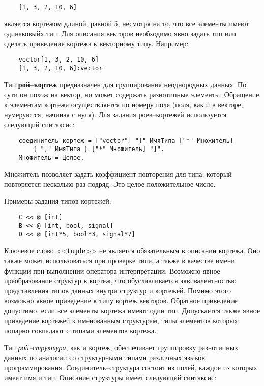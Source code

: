 {\begin{verbatim}
    [1, 3, 2, 10, 6]
\end{verbatim}

является кортежом длиной, равной 5, несмотря на то, что все элементы имеют одинаковыйх тип. Для описания векторов необходимо явно задать тип или сделать приведение кортежа к векторному типу. Например:

\begin{verbatim}
    vector[1, 3, 2, 10, 6]
    [1, 3, 2, 10, 6]:vector
\end{verbatim}

Тип \textbf{рой--кортеж} предназначен для группирования неоднородных данных. По сути он похож на вектор, но может содержать разнотипные элементы. Обращение к элементам кортежа осуществляется по номеру поля (поля, как и в векторе, нумеруются, начиная с нуля). Для задания роев--кортежей используется следующий синтаксис:

\begin{verbatim}
    соединитель-кортеж = ["vector"] "[" ИмяТипа ["*" Множитель]
        { "," ИмяТипа } ["*" Множитель] "]".
    Множитель = Целое.
\end{verbatim}

Множитель позволяет задать коэффициент повторения для типа, который повторяется несколько раз подряд. Это целое положительное число.

Примеры задания типов кортежей:

\begin{verbatim}
    С << @ [int]
    В << @ [int, bool, signal]
    D << @ [int*5, bool*3, signal*7]
\end{verbatim}

Ключевое слово <<\textbf{tuple}>> не является обязательным в описании кортежа. Оно также может использоваться при проверке типа, а также в качестве имени функции при выполнении оператора интерпретации. Возможно явное преобразование структур в кортеж, что обуславливается эквивалентностью представления типов данных внутри структур и кортежей. Помимо этого возможно явное приведение к типу кортеж векторов. Обратное приведение допустимо, если все элементы кортежа имеют один тип. Допускается также явное приведение кортежей к именованным структурам, типы элементов которых попарно совпадают с типами элементов кортежа.

Тип \textit{рой--структура}, как и кортеж, обеспечивает группировку разнотипных данных по аналогии со структурными типами различных языков программирования. Соединитель--структура состоит из полей, каждое из которых имеет имя и тип. Описание структуры имеет следующий синтаксис:

}
